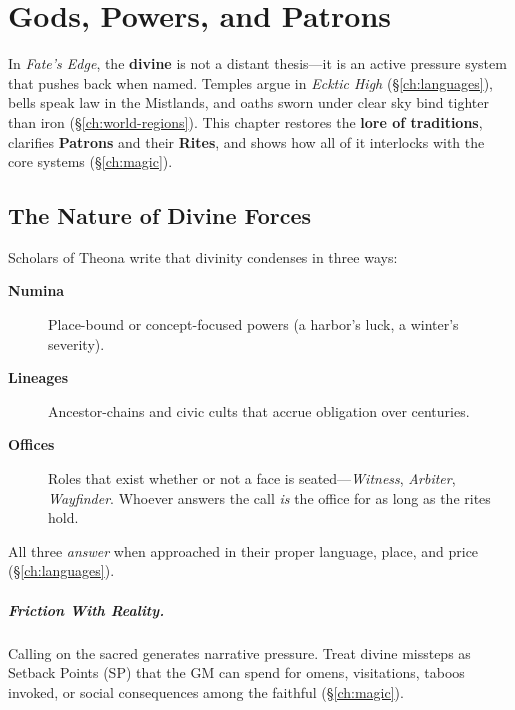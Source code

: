 
\chapter{Gods, Powers, and Patrons}
\label{ch:gods-powers-patrons}

\begin{multicols}{2}

In \textit{Fate’s Edge}, the \textbf{divine} is not a distant thesis—it is an active pressure system that pushes back when named. Temples argue in \emph{Ecktic High} (\S\ref{ch:languages}), bells speak law in the Mistlands, and oaths sworn under clear sky bind tighter than iron (\S\ref{ch:world-regions}). This chapter restores the \textbf{lore of traditions}, clarifies \textbf{Patrons} and their \textbf{Rites}, and shows how all of it interlocks with the core systems (\S\ref{ch:magic}).

\section{The Nature of Divine Forces}
Scholars of Theona write that divinity condenses in three ways:
\begin{description}
  \item[\textbf{Numina}]  Place-bound or concept-focused powers (a harbor’s luck, a winter’s severity).
  \item[\textbf{Lineages}]  Ancestor-chains and civic cults that accrue obligation over centuries.
  \item[\textbf{Offices}]  Roles that exist whether or not a face is seated—\emph{Witness}, \emph{Arbiter}, \emph{Wayfinder}. Whoever answers the call \emph{is} the office for as long as the rites hold.
\end{description}
All three \emph{answer} when approached in their proper language, place, and price (\S\ref{ch:languages}).

\paragraph{Friction With Reality.}
Calling on the sacred generates narrative pressure. Treat divine missteps as Setback Points (SP) that the GM can spend for omens, visitations, taboos invoked, or social consequences among the faithful (\S\ref{ch:magic}).


\end{multicols}
